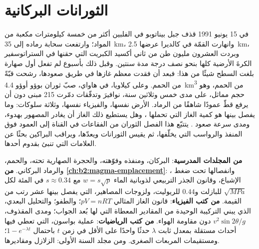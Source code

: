 \chapter{الثورانات البركانية}\label{ch:b2:eruptive-styles}

في 15 يونيو 1991 قذف جبل بيناتوبو في الفلبين أكثر من خمسة
كيلومترات مكعبة من المواد؛ وارتفعت سحابة رماده إلى
\qty{35}{km}، وانهارت القمّة في كالديرا عرضها \qty{2.5}{km}،
وبردت العشرون مليون طن من ثاني أكسيد الكبريت التي حقنها في الستراتوسفير
الكرةَ الأرضية كلها بنحو نصف درجة مدة سنتين. وقبل ذلك بأسبوع لم تفعل أول
صهارة بلغت السطح شيئًا من هذا: فبعد أن فقدت معظم
غازها في طريق صعودها، رشحت قبّةً من الحمم. وعلى كيلاويا، في هاواي، صبّ
ثوران بوؤو أوؤو \qty{4.4}{km^3} من الحمم، وهو حجم مماثل،
على مدى خمس وثلاثين سنة، نوافيرَ وتدفّقات دمّرت 215 مبنى
دون أن يرفع قطّ عمودًا شاهقًا من الرماد. الأرض نفسها، والفيزياء نفسها، وثلاثة سلوكات: وما
يفصل بينها هو كمية الغاز التي تحملها ، وهل يستطيع ذلك الغاز أن يغادر
المصهور بهدوء، ومدى سرعة صعود . يتتبّع هذا الفصل الثوران
من الفقاعات في القناة إلى العمود فوق المنفذ والرواسب التي
يخلّفها، ثم يقيس الثورانات ويعدّها، ويراقب البراكين بحثًا عن
العلامات التي تنبئ بقدوم أحدها.

\begin{recall}
\textbf{من المجلدات المدرسية}: البركان، ومنفذه وفوّهته، والحجرة الصهارية
تحته، والحمم، والرماد البركاني. \textbf{من
\cref{ch:b2:magma-emplacement}}: ، وانفصالها تحت
ضغط الإشباع، وقانون الجذر التربيعي لذوبانية الماء $w = s\sqrt p$ مع
$s \approx 0.34$ في المئة لكل $\sqrt{\unit{MPa}}$ للبازلت و$0.44$
للريوليت، ولزوجات المصاهير، التي يفصل بينها عشر رتب من القيمة.
\textbf{من كتب الفيزياء}: قانون الغاز المثالي $pV = nRT$؛ والطفو؛
والتحليل البعدي، الذي يبني التركيبة الوحيدة من المقادير المعطاة
التي لها بُعد الجواب؛ ومدى المقذوف، $v^2\sin 2\theta/g$
دون مقاومة الهواء. \textbf{من كتب الرياضيات}: عملية بواسون،
التي تعطي فيها أحداث مستقلة بمعدل ثابت $\lambda$ حدثًا واحدًا على الأقل
في زمن $t$ باحتمال $1 - e^{-\lambda t}$؛ ومستقيمات المربعات الصغرى.
ومن مجلد السنة الأولى: الزلازل ومقاديرها.
\end{recall}

